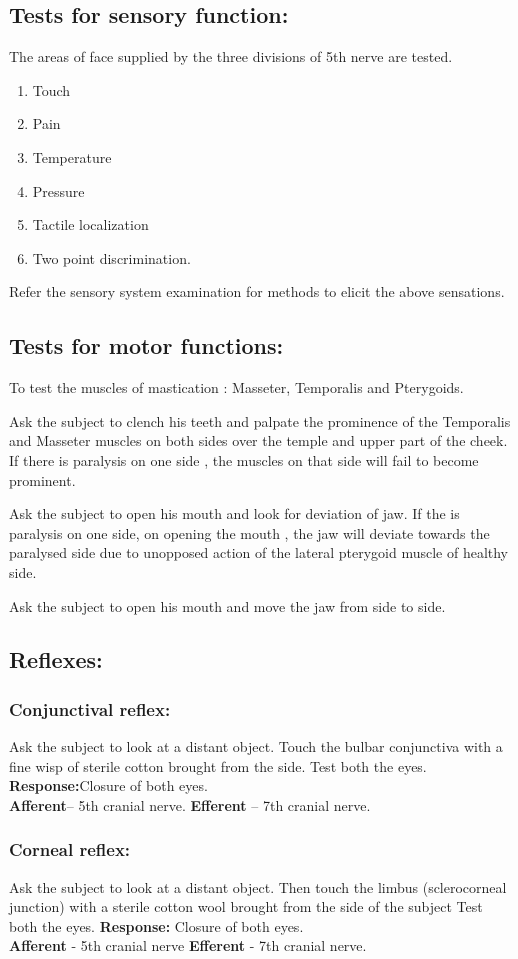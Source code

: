 \documentclass[a4paper,12pt,openany,oneside]{book}
\begin{document}
\subsection*{Tests for sensory function:}
The areas of face supplied by the three divisions of 5th nerve are tested.
\begin{enumerate}
\item{ Touch}
\item{ Pain	}
\item{ Temperature}
\item{ Pressure}
\item{ Tactile localization	}
\item{ Two point discrimination.}
\end{enumerate}
Refer the sensory system examination for methods to elicit the above sensations.
\subsection*{Tests for motor functions:}
To test the muscles of mastication : Masseter, Temporalis and Pterygoids.
\par
Ask the subject to clench his teeth and palpate the prominence of the Temporalis and Masseter muscles on both sides over the temple and upper part of the cheek. If there is paralysis on one side , the muscles on that side will fail to become prominent.
\par
Ask the subject to open his mouth and look for deviation of jaw. If the is paralysis on one side, on opening the mouth , the jaw will deviate towards the paralysed side due to unopposed action of the lateral pterygoid muscle of healthy side.
\par
Ask the subject to open his mouth and move the jaw from side to side.
\subsection*{Reflexes:}
\subsubsection*{Conjunctival reflex:}
	Ask the subject to look at a distant object. Touch the bulbar conjunctiva with a fine wisp of sterile cotton brought from the side. Test both the eyes.
\textbf{Response:}Closure of both eyes.\\ 
\textbf{Afferent}– 5th cranial nerve. \textbf{Efferent} – 7th cranial nerve.
\subsubsection*{Corneal reflex:}
Ask the subject to look at a distant object. Then touch the limbus (sclerocorneal junction) with a sterile cotton wool brought from the side of the subject Test both the eyes.
\textbf{Response:} Closure of both eyes.\\
\textbf{Afferent} - 5th cranial nerve
\textbf{Efferent} - 7th  cranial nerve.
\end{document}

